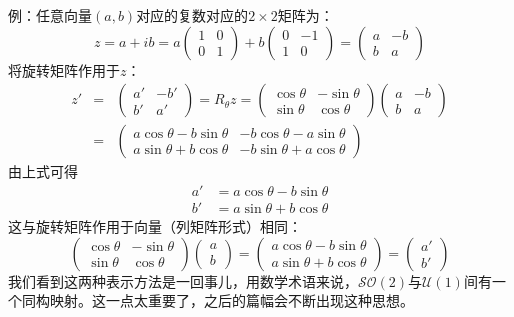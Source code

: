 例：任意向量$(a, b)$对应的复数对应的$2 \times 2$矩阵为：
\begin{equation}
\label{equ3.18}
z = a + ib = a
\begin{pmatrix}
	1 & 0 \\ 0 & 1
\end{pmatrix}
+ b
\begin{pmatrix}
	0 & -1 \\ 1 & 0
\end{pmatrix}
=
\begin{pmatrix}
	a & -b \\ b & a
\end{pmatrix}
\end{equation}
将旋转矩阵作用于$z$：
\begin{eqnarray}
\label{sec3.19}
	z' &=& \begin{pmatrix}
			a' & -b' \\ b' & a'
		 \end{pmatrix}
	= R_\theta z =
		\begin{pmatrix}
			\cos \theta & -\sin \theta \\
			\sin \theta & \cos \theta
		\end{pmatrix}
		\begin{pmatrix}
			a & -b \\ b & a
		\end{pmatrix}
	\nonumber \\
	&=& \begin{pmatrix}
			a\cos\theta - b\sin \theta & - b\cos \theta - a \sin \theta \\
			a\sin \theta + b\cos \theta & -b \sin \theta + a \cos \theta
		\end{pmatrix}
\end{eqnarray}
由上式可得
\begin{align}
\label{equ3.20}
a' &= a \cos \theta - b \sin \theta \\
\label{equ3.21}
b' &= a \sin \theta + b \cos \theta
\end{align}
这与旋转矩阵作用于向量（列矩阵形式）相同：
\begin{equation}
\label{equ3.22}
	\begin{pmatrix}
		\cos \theta & -\sin \theta \\
		\sin \theta & \cos \theta
	\end{pmatrix}
	\begin{pmatrix}
		a \\ b
	\end{pmatrix}
	=
	\begin{pmatrix}
		a \cos \theta - b \sin \theta \\
		a \sin \theta + b \cos \theta
	\end{pmatrix}
	=
	\begin{pmatrix}
		a' \\ b'
	\end{pmatrix}
\end{equation}
我们看到这两种表示方法是一回事儿，用数学术语来说，$\mathcal{SO}(2)$与$\mathcal{U}(1)$间有一个同构映射。这一点太重要了，之后的篇幅会不断出现这种思想。

